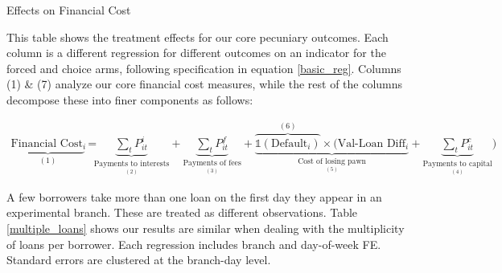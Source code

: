 \documentclass[oneside,11pt]{article}
\begin{document}
\begin{table}[H]
\caption{Effects on Financial Cost}
\label{main_impact_table}
\begin{center}
\scriptsize{}
\end{center}
\scriptsize This table shows the treatment effects for our core pecuniary outcomes. Each column is a different regression for different outcomes on an indicator for the forced and choice arms, following specification in equation \ref{basic_reg}. Columns (1) \& (7) analyze our core financial cost measures, while the rest of the columns decompose these into finer components as follows:

\begin{align*}
    \underbrace{\text{Financial Cost}_i}_{(1)} =&  \underbrace{\sum_t P^i_{it}}_{\underset{(2)}{\text{Payments to interests}}}  +\underbrace{\sum_t P^f_{it}}_{\underset{(3)}{\text{Payments of fees}}} + \underbrace{\overbrace{\mathds{1}(\text{Default}_i)}^{(6)}\times (\text{Val-Loan Diff}_i}_{\underset{(5)}{\text{Cost of losing pawn}}} + \underbrace{\sum_t P^c_{it}}_{\underset{(4)}{\text{Payments to capital}}})
\end{align*}

A few borrowers take more than one loan on the first day they appear in an experimental branch.  These are treated as different observations. Table \ref{multiple_loans} shows our results are similar when dealing with the multiplicity of loans per borrower. Each regression includes branch and day-of-week FE. Standard errors are clustered at the branch-day level. 

\end{table}
\end{document}

